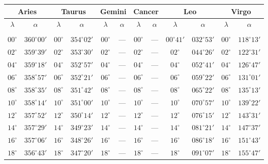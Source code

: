 \clearpage
\begin{table}[!h]
\vspace{0.25cm}
\centering
{\scriptsize \begin{tabular}{cc|cc|cc|cc|cc|cc}
\multicolumn{2}{c}{Aries}\vline & \multicolumn{2}{c}{Taurus} \vline& \multicolumn{2}{c}{Gemini} \vline& \multicolumn{2}{c}{Cancer}\vline &
\multicolumn{2}{c}{Leo}\vline & \multicolumn{2}{c}{Virgo}\\\hline
$\lambda$& $\alpha$& $\lambda$& $\alpha$& $\lambda$& $\alpha$& $\lambda$& $\alpha$& $\lambda$& $\alpha$& $\lambda$& $\alpha$\\\hline
&&&&&&&&&&&\\[-2ex]
$00^\circ$ & $360^\circ00'$ & $00^\circ$ & $354^\circ02'$ & $00^\circ$ &  ---& $00^\circ$ & --- & $00^\circ41'$ & $032^\circ53'$& $00^\circ$ & $118^\circ13'$\\
$02^\circ$ & $359^\circ39'$ & $02^\circ$ & $353^\circ30'$ & $02^\circ$ & --- & $02^\circ$ & --- & $02^\circ$ & $044^\circ26'$ & $02^\circ$ & $122^\circ31'$\\
$04^\circ$ & $359^\circ18'$ & $04^\circ$ & $352^\circ57'$ & $04^\circ$ & --- & $04^\circ$ & --- & $04^\circ$ & $052^\circ41'$ & $04^\circ$ & $126^\circ47'$\\
$06^\circ$ & $358^\circ57'$ & $06^\circ$ & $352^\circ21'$ & $06^\circ$ & --- & $06^\circ$ & --- & $06^\circ$ & $059^\circ22'$ & $06^\circ$ & $131^\circ01'$\\
$08^\circ$ & $358^\circ35'$ & $08^\circ$ & $351^\circ42'$ & $08^\circ$ & --- & $08^\circ$ & --- & $08^\circ$ & $065^\circ22'$ & $08^\circ$ & $135^\circ13'$\\
$10^\circ$ & $358^\circ14'$ & $10^\circ$ & $351^\circ00'$ & $10^\circ$ & --- & $10^\circ$ & --- & $10^\circ$ & $070^\circ57'$ & $10^\circ$ & $139^\circ22'$\\
$12^\circ$ & $357^\circ52'$ & $12^\circ$ & $350^\circ14'$ & $12^\circ$ & --- & $12^\circ$ & --- & $12^\circ$ & $076^\circ15'$ & $12^\circ$ & $143^\circ31'$\\
$14^\circ$ & $357^\circ29'$ & $14^\circ$ & $349^\circ23'$ & $14^\circ$ & --- & $14^\circ$ & --- & $14^\circ$ & $081^\circ21'$ & $14^\circ$ & $147^\circ37'$\\
$16^\circ$ & $357^\circ06'$ & $16^\circ$ & $348^\circ26'$ & $16^\circ$ & --- & $16^\circ$ & --- & $16^\circ$ & $086^\circ18'$ & $16^\circ$ & $151^\circ43'$\\
$18^\circ$ & $356^\circ43'$ & $18^\circ$ & $347^\circ20'$ & $18^\circ$ & --- & $18^\circ$ & --- & $18^\circ$ & $091^\circ07'$ & $18^\circ$ & $155^\circ47'$\\

\end{tabular}}
\end{table}
